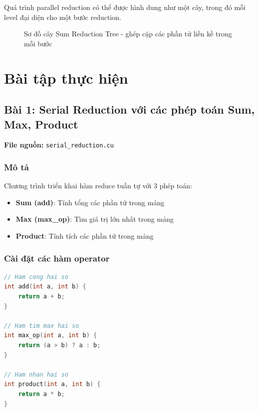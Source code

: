 \documentclass[12pt,a4paper]{article}
\begin{document}
Quá trình parallel reduction có thể được hình dung như một cây, trong đó mỗi level đại diện cho một bước reduction.

\begin{figure}[h]
    \centering
    \caption{Sơ đồ cây Sum Reduction Tree - ghép cặp các phần tử liền kề trong mỗi bước}
    \label{fig:sum_reduction_tree}
\end{figure}

\section{Bài tập thực hiện}

\subsection{Bài 1: Serial Reduction với các phép toán Sum, Max, Product}

\textbf{File nguồn:} \texttt{serial\_reduction.cu}

\subsubsection{Mô tả}

Chương trình triển khai hàm reduce tuần tự với 3 phép toán:
\begin{itemize}
    \item \textbf{Sum (add)}: Tính tổng các phần tử trong mảng
    \item \textbf{Max (max\_op)}: Tìm giá trị lớn nhất trong mảng
    \item \textbf{Product}: Tính tích các phần tử trong mảng
\end{itemize}

\subsubsection{Cài đặt các hàm operator}

\begin{lstlisting}[language=C, caption=Các hàm operator cho reduction]
// Ham cong hai so
int add(int a, int b) { 
    return a + b; 
}

// Ham tim max hai so
int max_op(int a, int b) { 
    return (a > b) ? a : b; 
}

// Ham nhan hai so
int product(int a, int b) { 
    return a * b; 
}
\end{lstlisting}
\end{document}
